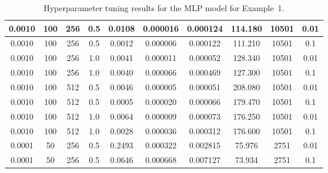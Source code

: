 \documentclass[conference]{IEEEtran}
\begin{document}
\begin{table}[ht]
{\begin{tabular}{|c|c|c|c|c|c|c|c|c|c|}
            0.0010                 & 100                 & 256                 & 0.5               & 0.0108            & 0.000016         & 0.000124            & 114.180                    & 10501                  & 0.01           \\ \hline
            0.0010                 & 100                 & 256                 & 0.5               & 0.0012            & 0.000006         & 0.000122            & 111.210                    & 10501                  & 0.1            \\ \hline
            0.0010                 & 100                 & 256                 & 1.0               & 0.0041            & 0.000011         & 0.000052            & 128.340                    & 10501                  & 0.01           \\ \hline
            0.0010                 & 100                 & 256                 & 1.0               & 0.0040            & 0.000066         & 0.000469            & 127.300                    & 10501                  & 0.1            \\ \hline
            0.0010                 & 100                 & 512                 & 0.5               & 0.0046            & 0.000005         & 0.000051            & 208.080                    & 10501                  & 0.01           \\ \hline
            0.0010                 & 100                 & 512                 & 0.5               & 0.0005            & 0.000020         & 0.000066            & 179.470                    & 10501                  & 0.1            \\ \hline
            0.0010                 & 100                 & 512                 & 1.0               & 0.0064            & 0.000009         & 0.000073            & 176.250                    & 10501                  & 0.01           \\ \hline
            0.0010                 & 100                 & 512                 & 1.0               & 0.0028            & 0.000036         & 0.000312            & 176.600                    & 10501                  & 0.1            \\ \hline
            0.0001                 & 50                  & 256                 & 0.5               & 0.2493            & 0.000322         & 0.002815            & 75.976                     & 2751                   & 0.01           \\ \hline
            0.0001                 & 50                  & 256                 & 0.5               & 0.0646            & 0.000668         & 0.007127            & 73.934                     & 2751                   & 0.1            \\ \hline
            \bottomrule
        \end{tabular}%
    }
    \caption{Hyperparameter tuning results for the MLP model for Example~1.}
    \label{tab:mlp_hyperparam_tuning}
\end{table}
\end{document}
